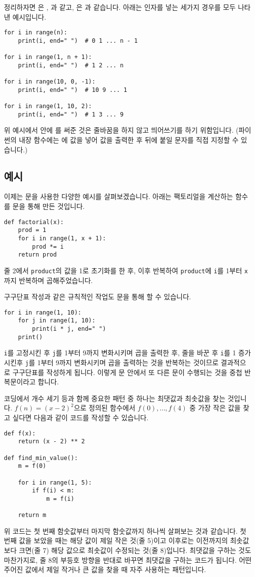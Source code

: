 \documentclass[../main.tex]{subfiles}
\begin{document}
정리하자면 은 , 과 같고, 은 과 같습니다.
아래는 인자를 넣는 세가지 경우를 모두 나타낸 예시입니다.
\begin{verbatim}
for i in range(n):
    print(i, end=" ")  # 0 1 ... n - 1

for i in range(1, n + 1):
    print(i, end=" ")  # 1 2 ... n

for i in range(10, 0, -1):
    print(i, end=" ")  # 10 9 ... 1

for i in range(1, 10, 2):
    print(i, end=" ")  # 1 3 ... 9
\end{verbatim}
위 예시에서 안에 를 써준 것은 줄바꿈을 하지 않고
띄어쓰기를 하기 위함입니다.
(파이썬의 내장  함수에는 에 값을 넣어 값을 출력한 후
뒤에 붙일 문자를 직접 지정할 수 있습니다.)

\subsection{예시}
이제는  문을 사용한 다양한 예시를 살펴보겠습니다.
아래는 팩토리얼을 계산하는 함수를  문을 통해 만든 것입니다.
\begin{verbatim}
def factorial(x):
    prod = 1
    for i in range(1, x + 1):
        prod *= i
    return prod
\end{verbatim}
줄 2에서 \texttt{product}의 값을 1로 초기화를 한 후, 이후 반복하여
\verb|product|에 \verb|i|를 1부터 \verb|x|까지 반복하며 곱해주었습니다.

구구단표 작성과 같은 규칙적인 작업도  문을 통해 할 수 있습니다.
\begin{verbatim}
for i in range(1, 10):
    for j in range(1, 10):
        print(i * j, end=" ")
    print()
\end{verbatim}
\texttt{i}를 고정시킨 후 \texttt{j}를 1부터 9까지 변화시키며 곱을 출력한 후, 줄을 바꾼 후 \texttt{i}를 1 증가시킨후 \texttt{j}를 1부터 9까지 변화시키며 곱을 출력하는 것을 반복하는 것이므로 결과적으로 구구단표를 작성하게 됩니다.
이렇게  문 안에서 또 다른  문이 수행되는 것을 중첩 반복문이라고 합니다.

코딩에서 개수 세기 등과 함께 중요한 패턴 중 하나는 최댓값과 최솟값을 찾는 것입니다.
$f(n) = (x - 2)^2$으로 정의된 함수에서 $f(0), \dots, f(4)$ 중 가장 작은 값을
찾고 싶다면 다음과 같이 코드를 작성할 수 있습니다.
\begin{verbatim}
def f(x):
    return (x - 2) ** 2

def find_min_value():
    m = f(0)

    for i in range(1, 5):
        if f(i) < m:
            m = f(i)

    return m
\end{verbatim}
위 코드는 첫 번째 함숫값부터 마지막 함숫값까지 하나씩 살펴보는 것과 같습니다.
첫 번째 값을 보았을 때는 해당 값이 제일 작은 것(줄 5)이고 이후로는 이전까지의
최솟값보다 크면(줄 7) 해당 값으로 최솟값이 수정되는 것(줄 8)입니다.
최댓값을 구하는 것도 마찬가지로, 줄 8의 부등호 방향을 반대로 바꾸면 최댓값을 구하는 코드가 됩니다.
어떤 주어진 값에서 제일 작거나 큰 값을 찾을 때 자주 사용하는 패턴입니다.
\end{document}
